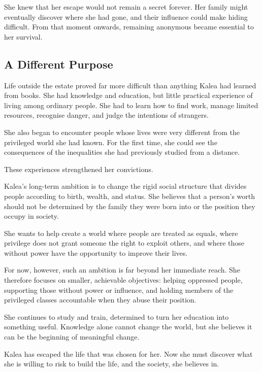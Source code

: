 \documentclass[11pt,a4paper,twoside]{article}
\begin{document}
She knew that her escape would not remain a secret forever. Her family might eventually discover where she had gone, and their influence could make hiding difficult. From that moment onwards, remaining anonymous became essential to her survival.

\subsection{A Different Purpose}

Life outside the estate proved far more difficult than anything Kalea had learned from books. She had knowledge and education, but little practical experience of living among ordinary people. She had to learn how to find work, manage limited resources, recognise danger, and judge the intentions of strangers.

She also began to encounter people whose lives were very different from the privileged world she had known. For the first time, she could see the consequences of the inequalities she had previously studied from a distance.

These experiences strengthened her convictions.

Kalea's long-term ambition is to change the rigid social structure that divides people according to birth, wealth, and status. She believes that a person's worth should not be determined by the family they were born into or the position they occupy in society.

She wants to help create a world where people are treated as equals, where privilege does not grant someone the right to exploit others, and where those without power have the opportunity to improve their lives.

For now, however, such an ambition is far beyond her immediate reach. She therefore focuses on smaller, achievable objectives: helping oppressed people, supporting those without power or influence, and holding members of the privileged classes accountable when they abuse their position.

She continues to study and train, determined to turn her education into something useful. Knowledge alone cannot change the world, but she believes it can be the beginning of meaningful change.

Kalea has escaped the life that was chosen for her. Now she must discover what she is willing to risk to build the life, and the society, she believes in.
\end{document}
